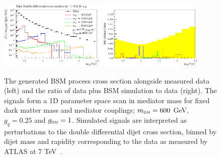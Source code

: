 \documentclass[floatfix]{article}
\begin{document}
\begin{figure}[!htb]
\begin{center}

\includegraphics[width=0.45\textwidth]{images/ATLAS_dijet.pdf}
\includegraphics[width=0.45\textwidth]{images/ATLAS_dijet_ratio.pdf}

\caption{The generated BSM process cross section alongside measured data (left) and the ratio of data plus BSM simulation to data (right). The signals form a 1D parameter space scan in mediator mass for fixed dark matter mass and mediator couplings; $m_{\textsc{dm}}=600$ GeV, $g_{q}=0.25$ and $g_{\textsc{dm}} = 1$. Simulated signals are interpreted as perturbations to the double differential dijet cross section, binned by dijet mass and rapidity corresponding to the data as measured by ATLAS at 7 TeV~\cite{Aad:2014pua}.}
\label{fig:ATLASdijet}
\end{center}
\end{figure}
\end{document}
